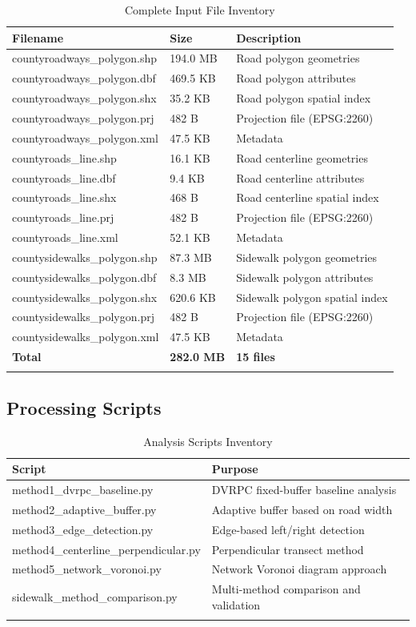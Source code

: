 \documentclass[11pt,letterpaper]{article}
\begin{document}
\begin{longtable}{p{5cm}p{2cm}p{6cm}}
\toprule
\textbf{Filename} & \textbf{Size} & \textbf{Description} \\
\midrule
\endhead
countyroadways\_polygon.shp & 194.0 MB & Road polygon geometries \\
countyroadways\_polygon.dbf & 469.5 KB & Road polygon attributes \\
countyroadways\_polygon.shx & 35.2 KB & Road polygon spatial index \\
countyroadways\_polygon.prj & 482 B & Projection file (EPSG:2260) \\
countyroadways\_polygon.xml & 47.5 KB & Metadata \\
countyroads\_line.shp & 16.1 KB & Road centerline geometries \\
countyroads\_line.dbf & 9.4 KB & Road centerline attributes \\
countyroads\_line.shx & 468 B & Road centerline spatial index \\
countyroads\_line.prj & 482 B & Projection file (EPSG:2260) \\
countyroads\_line.xml & 52.1 KB & Metadata \\
countysidewalks\_polygon.shp & 87.3 MB & Sidewalk polygon geometries \\
countysidewalks\_polygon.dbf & 8.3 MB & Sidewalk polygon attributes \\
countysidewalks\_polygon.shx & 620.6 KB & Sidewalk polygon spatial index \\
countysidewalks\_polygon.prj & 482 B & Projection file (EPSG:2260) \\
countysidewalks\_polygon.xml & 47.5 KB & Metadata \\
\midrule
\textbf{Total} & \textbf{282.0 MB} & \textbf{15 files} \\
\bottomrule
\caption{Complete Input File Inventory}
\label{tab:file_inventory}
\end{longtable}

\subsection{Processing Scripts}

\begin{longtable}{p{6cm}p{7cm}}
\toprule
\textbf{Script} & \textbf{Purpose} \\
\midrule
\endhead
method1\_dvrpc\_baseline.py & DVRPC fixed-buffer baseline analysis \\
method2\_adaptive\_buffer.py & Adaptive buffer based on road width \\
method3\_edge\_detection.py & Edge-based left/right detection \\
method4\_centerline\_perpendicular.py & Perpendicular transect method \\
method5\_network\_voronoi.py & Network Voronoi diagram approach \\
sidewalk\_method\_comparison.py & Multi-method comparison and validation \\
\bottomrule
\caption{Analysis Scripts Inventory}
\label{tab:scripts}
\end{longtable}
\end{document}
